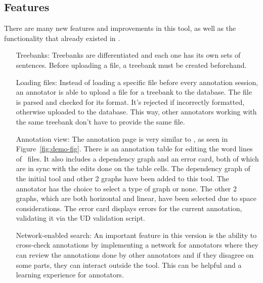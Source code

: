\subsection{Features}
\label{sec:features}

There are many new features and improvements in this tool, as well as the functionality that already existed in \boatvone.

\begin{itemize}[before=\normalfont, font=\itshape, align=left]
\item[Treebanks:] Treebanks are differentiated and each one has its own sets of sentences.
Before uploading a \conllu{} file, a treebank must be created beforehand.

\item[Loading files:] Instead of loading a specific file before every annotation session, an annotator is able to upload a \conllu{} file for a treebank to the database.
The file is parsed and checked for its format. It's rejected if incorrectly formatted, otherwise uploaded to the database.
This way, other annotators working with the same treebank don't have to provide the same file.

\item[Annotation view:] The annotation page is very similar to \boatvone, as seen in Figure~\ref{fig:demo-fig}.
There is an annotation table for editing the word lines of \conllu\ files.
It also includes a dependency graph and an error card, both of which are in sync with the edits done on the table cells.
The dependency graph of the initial tool and other 2 graphs have been added to this tool.
The annotator has the choice to select a type of graph or none.
The other 2 graphs, which are both horizontal and linear, have been selected due to space considerations.
The error card displays errors for the current annotation, validating it via the UD validation script.

\item[Network-enabled search:] An important feature in this version is the ability to cross-check annotations by implementing a network for annotators where they can review the annotations done by other annotators and if they disagree on some parts, they can interact outside the tool.
This can be helpful and a learning experience for annotators.


\end{itemize}
